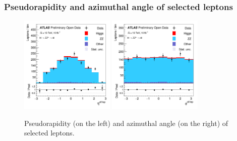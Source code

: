 \documentclass[aspectratio=1610, english]{beamer}
\begin{document}
\begin{frame}
\frametitle{Pseudorapidity and azimuthal angle of selected leptons}

\begin{figure} [H]
\centering
\includegraphics[width=0.4\textwidth]{hist_fourlepteta.png}
\includegraphics[width=0.4\textwidth]{hist_fourleptphi.png}
\caption{Pseudorapidity (on the left) and azimuthal angle (on the right) of selected leptons. }
\end{figure}

\end{frame}
\end{document}
